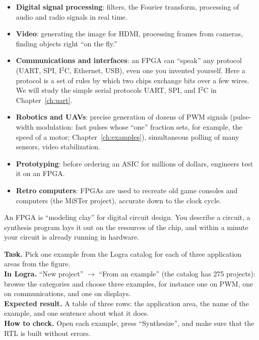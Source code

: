 \begin{itemize}
  \item \textbf{Digital signal processing}: filters, the Fourier
        transform, processing of audio and radio signals in real time.
  \item \textbf{Video}: generating the image for HDMI, processing frames from cameras,
        finding objects right ``on the fly.''
  \item \textbf{Communications and interfaces}: an FPGA can ``speak'' any
        protocol (UART, SPI, I$^2$C, Ethernet, USB), even one you invented yourself.
        Here a protocol is a set of rules by which two chips
        exchange bits over a few wires. We will study the simple serial
        protocols UART, SPI, and I$^2$C in Chapter~\ref{ch:uart}.
  \item \textbf{Robotics and UAVs}: precise generation of dozens of PWM signals (pulse-width modulation:
        fast pulses whose ``one'' fraction sets, for example, the speed
        of a motor; Chapter~\ref{ch:examples}),
        simultaneous polling of many sensors, video stabilization.
  \item \textbf{Prototyping}: before ordering an ASIC for
        millions of dollars, engineers test it on an FPGA.
  \item \textbf{Retro computers}: FPGAs are used to recreate old game
        consoles and computers (the MiSTer project), accurate down to the clock cycle.
\end{itemize}

\begin{ideabox}
An FPGA is ``modeling clay'' for digital circuit design. You describe a circuit,
a synthesis program lays it out on the resources of the chip, and within
a minute your circuit is already running in hardware.
\end{ideabox}

\begin{diybox}
\textbf{Task.} Pick one example from the Logra catalog for each of three application areas from the figure.\\
\textbf{In Logra.} ``New project'' $\to$ ``From an example'' (the catalog has 275 projects): browse the categories and choose three examples, for instance one on PWM, one on communications, and one on displays.\\
\textbf{Expected result.} A table of three rows: the application area, the name of the example, and one sentence about what it does.\\
\textbf{How to check.} Open each example, press ``Synthesize'', and make sure that the RTL is built without errors.
\end{diybox}

